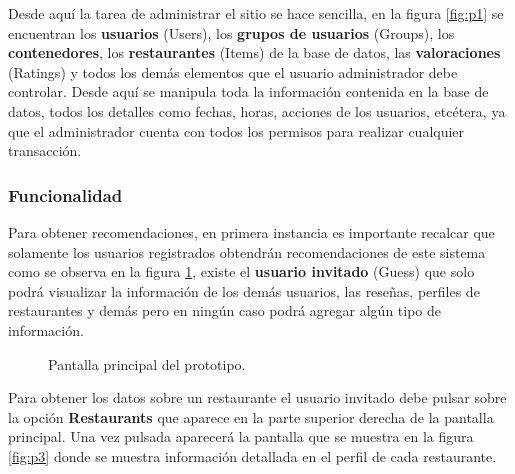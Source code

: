 \documentclass[12pt,letterpaper,oneside] {memoir}
\begin{document}
Desde aquí la tarea de administrar el sitio se hace sencilla, en la figura \ref{fig:p1} se encuentran los \textbf{usuarios} (Users), los \textbf{grupos de usuarios} (Groups), los \textbf{contenedores}, los \textbf{restaurantes} (Items) de la base de datos, las \textbf{valoraciones} (Ratings) y todos los demás elementos que el usuario administrador debe controlar.  Desde aquí se manipula toda la información contenida en la base de datos, todos los detalles como fechas, horas, acciones de los usuarios, etcétera, ya que el administrador cuenta con todos los permisos para realizar cualquier transacción.

\subsubsection{Funcionalidad}

Para obtener recomendaciones, en primera instancia es importante recalcar que solamente los usuarios registrados obtendrán recomendaciones de este sistema como se observa en la figura \ref{fig:p2}, existe el \textbf{usuario invitado} (Guess) que solo podrá visualizar la información de los demás usuarios, las reseñas, perfiles de restaurantes y demás pero en ningún caso podrá agregar algún tipo de información.\\

\begin{figure}[H]
\centering 
{} \caption{Pantalla principal del prototipo.} 
\label{fig:p2} 
\end{figure}

Para obtener los datos sobre un restaurante el usuario invitado debe pulsar sobre la opción \textbf{Restaurants} que aparece en la parte superior derecha de la pantalla principal. Una vez pulsada aparecerá la pantalla que se muestra en la figura \ref{fig:p3} donde se muestra información detallada en el perfil de cada restaurante.\\
\end{document}
